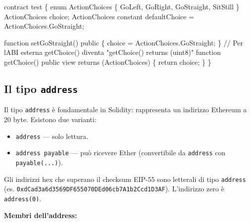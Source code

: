 \documentclass[
  italian,
  openany]{book}
\newenvironment{Shaded}{\begin{snugshade}}{\end{snugshade}}
\newcommand{\NormalTok}[1]{#1}
\providecommand{\tightlist}{%
  \setlength{\itemsep}{0pt}\setlength{\parskip}{0pt}}
\begin{document}
\begin{Shaded}
\begin{Highlighting}[]
\NormalTok{contract test \{}
\NormalTok{    enum ActionChoices \{ GoLeft, GoRight, GoStraight, SitStill \}}
\NormalTok{    ActionChoices choice;}
\NormalTok{    ActionChoices constant defaultChoice = ActionChoices.GoStraight;}

\NormalTok{    function setGoStraight() public \{}
\NormalTok{        choice = ActionChoices.GoStraight;}
\NormalTok{    \}}
\NormalTok{    // Per l\textquotesingle{}ABI esterna getChoice() diventa "getChoice() returns (uint8)"}
\NormalTok{    function getChoice() public view returns (ActionChoices) \{}
\NormalTok{        return choice;}
\NormalTok{    \}}
\NormalTok{\}}
\end{Highlighting}
\end{Shaded}

\subsection{\texorpdfstring{Il tipo
\texttt{address}}{Il tipo address}}\label{il-tipo-address}

Il tipo \texttt{address} è fondamentale in Solidity: rappresenta un
indirizzo Ethereum a 20 byte. Esistono due varianti:

\begin{itemize}
\tightlist
\item
  \texttt{address} --- solo lettura.
\item
  \texttt{address\ payable} --- può ricevere Ether (convertibile da
  \texttt{address} con \texttt{payable(...)}).
\end{itemize}

Gli indirizzi hex che superano il checksum EIP-55 sono letterali di tipo
\texttt{address} (es.
\texttt{0xdCad3a6d3569DF655070DEd06cb7A1b2Ccd1D3AF}). L'indirizzo zero è
\texttt{address(0)}.

\textbf{Membri dell'address:}
\end{document}

